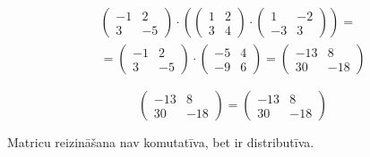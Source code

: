 \documentclass{article}
\begin{document}
\begin{gather*}
    \begin{pmatrix}
        -1 & 2\\
        3 & -5
    \end{pmatrix}
    \cdot
    \left(
        \begin{pmatrix}
            1 & 2\\
            3 & 4
        \end{pmatrix}
        \cdot
        \begin{pmatrix}
            1 & -2\\
            -3 & 3
        \end{pmatrix}
    \right)
    =
    \\
    =
    \begin{pmatrix}
        -1 & 2\\
        3 & -5
    \end{pmatrix}
    \cdot
    \begin{pmatrix}
        -5 & 4\\
        -9 & 6
    \end{pmatrix}
    =
    \begin{pmatrix}
        -13 & 8\\
        30 & -18
    \end{pmatrix}
\end{gather*}

\begin{equation*}
    \begin{pmatrix}
        -13 & 8\\
        30 & -18
    \end{pmatrix}
    =
    \begin{pmatrix}
        -13 & 8\\
        30 & -18
    \end{pmatrix}
\end{equation*}

Matricu reizināšana nav komutatīva, bet ir distributīva.
\end{document}
